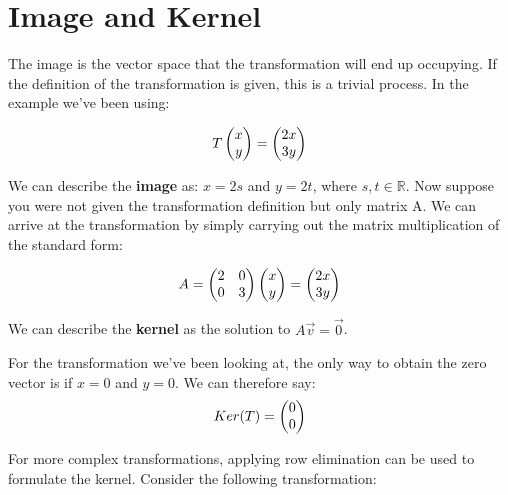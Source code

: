 \documentclass{article}
\begin{document}
	
\section{Image and Kernel}
\par \noindent The image is the vector space that the transformation will end up occupying. If the definition of the transformation is given, this is a trivial process. In the example we've been using:

 	\[
 T
 \left(\begin{array}{@{}c@{}}
 	x \\
 	y \\
 \end{array}\right) = 
 \left(\begin{array}{@{}c@{}}
 	2x \\
 	3y \\
 \end{array}\right) 
 \]
	
\par \noindent We can describe the \textbf{image} as: \(x=2s\) and \(y=2t\), where \(s,t \in \mathbb{R}\). Now suppose you were not given the transformation definition but only matrix A. We can arrive at the transformation by simply carrying out the matrix multiplication of the standard form:

		\[A=
\left(\begin{array}{@{}cc@{}}
	2 & 0 \\
	0 & 3 \\
\end{array}\right)
\left(\begin{array}{@{}c@{}}
	x \\
	y \\
\end{array}\right) = 
 \left(\begin{array}{@{}c@{}}
	2x \\
	3y \\
\end{array}\right) 
\]	

\par \noindent We can describe the \textbf{kernel} as the solution to \(A \vec v = \vec 0\). 
\newline
\par \noindent For the transformation we've been looking at, the only way to obtain the zero vector is if \(x=0\) and \(y=0\). We can therefore say:
\[
Ker(T) = 
\left(\begin{array}{@{}c@{}}
	0 \\
	0 \\
\end{array}\right) 
\]
\par \noindent For more complex transformations, applying row elimination can be used to formulate the kernel. Consider the following transformation:
\end{document}
